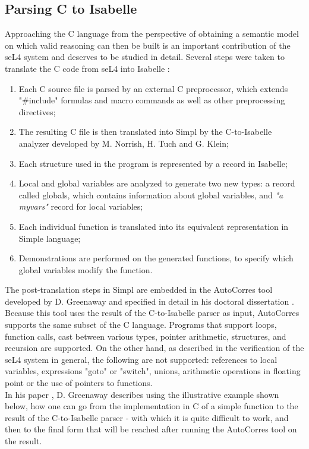 \documentclass[conference]{IEEEtran}
\begin{document}
\subsection{Parsing C to Isabelle}
Approaching the C language from the perspective of obtaining a semantic model on which valid reasoning can then be built is an important contribution of the seL4 system and deserves to be studied in detail. Several steps were taken to translate the C code from seL4 into Isabelle \cite{greenaway}:
\begin{enumerate}
    \item Each C source file is parsed by an external C preprocessor, which extends "\#include" formulas and macro commands as well as other preprocessing directives;
    \item The resulting C file is then translated into Simpl by the C-to-Isabelle analyzer \cite{tuch} developed by M. Norrish, H. Tuch and G. Klein;
    \item Each structure used in the program is represented by a record in Isabelle;
    \item Local and global variables are analyzed to generate two new types: a record called globals, which contains information about global variables, and \textit{"a myvars"} record for local variables;
    \item Each individual function is translated into its equivalent representation in Simple language;
    \item Demonstrations are performed on the generated functions, to specify which global variables modify the function.
\end{enumerate}
The post-translation steps in Simpl are embedded in the AutoCorres tool developed by D. Greenaway and specified in detail in his doctoral dissertation \cite{greenaway}. Because this tool uses the result of the C-to-Isabelle parser as input, AutoCorres supports the same subset of the C language. Programs that support loops, function calls, cast between various types, pointer arithmetic, structures, and recursion are supported. On the other hand, as described in the verification of the seL4 system in general, the following are not supported: references to local variables, expressions "goto" or "switch", unions, arithmetic operations in floating point or the use of pointers to functions. \\
In his paper \cite{greenaway}, D. Greenaway describes using the illustrative example shown below, how one can go from the implementation in C of a simple function to the result of the C-to-Isabelle parser - with which it is quite difficult to work, and then to the final form that will be reached after running the AutoCorres tool on the result.\\
\end{document}
